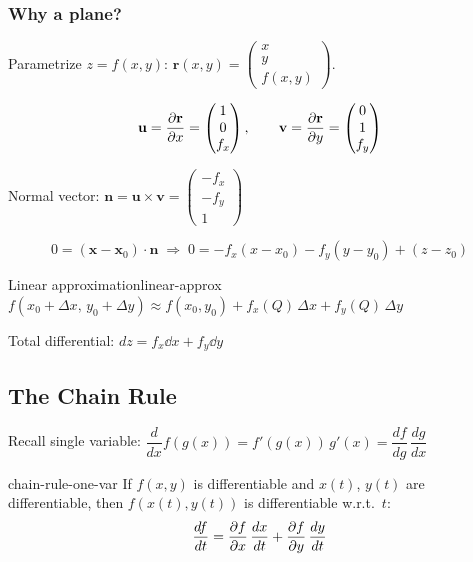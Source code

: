\subsubsection{Why a plane?}

Parametrize $z=f(x,y)$:
$\mathbf{r}(x,y)=
  \begin{pmatrix}
    x \\y\\f(x,y)
  \end{pmatrix}
$.

\[
  \mathbf{u} = \frac{\partial \mathbf{r}}{\partial x}=
  \begin{pmatrix}
    1 \\0\\f_{x}
  \end{pmatrix}
  ,
  \qquad
  \mathbf{v} = \frac{\partial \mathbf{r}}{\partial y}=
  \begin{pmatrix}
    0 \\1\\f_{y}
  \end{pmatrix}
\]

Normal vector:
$\mathbf{n}=\mathbf{u}\times\mathbf{v}=
  \begin{pmatrix}
    -f_{x} \\-f_{y}\\1
  \end{pmatrix}
$

\[
  0 = (\mathbf{x}-\mathbf{x}_{0})\cdot\mathbf{n}
  \;\Longrightarrow\;
  0 = -f_{x}(x-x_{0})-f_{y}(y-y_{0})+(z-z_{0})
\]

\begin{definition}{Linear approximation}{linear-approx}
  $f(x_{0}+\Delta x,\,y_{0}+\Delta y)
    \approx f(x_{0},y_{0})+f_{x}(Q)\,\Delta x+f_{y}(Q)\,\Delta y$

  Total differential: $dz = f_{x}\dd{x}+f_{y}\dd{y}$
\end{definition}

\subsection{The Chain Rule}

Recall single variable:
$\dfrac{d}{dx}f(g(x))=f'(g(x))\,g'(x)=\dfrac{df}{dg}\,\dfrac{dg}{dx}$

\begin{theorem}{}{chain-rule-one-var}
  If $f(x,y)$ is differentiable and $x(t)$, $y(t)$ are differentiable, then
  $f(x(t),y(t))$ is differentiable w.r.t.\ $t$:
  \[
    \frac{df}{dt}
    = \frac{\partial f}{\partial x}\,\frac{dx}{dt}+\frac{\partial f}{\partial y}\,\frac{dy}{dt}
  \]
\end{theorem}

